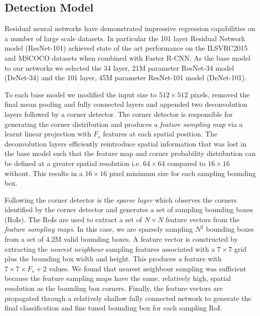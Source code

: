 \documentclass[10pt,twocolumn]{article}
\begin{document}
\newpage


\subsection{Detection Model} \label{sec:model}

Residual neural networks \cite{resnet} have demonstrated impressive regression capabilities on a number of large scale datasets. In particular the 101 layer Residual Network model (ResNet-101) achieved state of the art performance on the ILSVRC2015\cite{imagenet} and MSCOCO\cite{mscoco} datasets when combined with Faster R-CNN. As the base model to our networks we selected the 34 layer, 21M parameter ResNet-34 model (DeNet-34) and the 101 layer, 45M parameter ResNet-101 model (DeNet-101).



To each base model we modified the input size to $512\times 512$ pixels, removed the final mean pooling and fully connected layers and appended two deconvolution\cite{deconv} layers followed by a corner detector. The corner detector is responsible for generating the corner distribution and produces a \textit{feature sampling map} via a learnt linear projection with $F_s$ features at each spatial position. The deconvolution\cite{deconv} layers efficiently reintroduce spatial information that was lost in the base model such that the feature map and corner probability distribution can be defined at a greater spatial resolution i.e. $64\times 64$ compared to $16\times 16$ without. This results in a $16\times 16$ pixel minimum size for each sampling bounding box.

Following the corner detector is the \textit{sparse layer} which observes the corners identified by the corner detector and generates a set of sampling bounding boxes (RoIs). The RoIs are used to extract a set of $N \times N$ feature vectors from the \textit{feature sampling maps}. In this case, we are sparsely sampling $N^2$ bounding boxes from a set of 4.2M valid bounding boxes. A feature vector is constructed by extracting the \textit{nearest neighbour} sampling features associated with a $7\times 7$ grid plus the bounding box width and height. This produces a feature with $7 \times 7 \times F_s + 2$ values. We found that nearest neighbour sampling was sufficient because the feature sampling maps have the same, relatively high, spatial resolution as the bounding box corners. Finally, the feature vectors are propagated through a relatively shallow fully connected network to generate the final classification and fine tuned bounding box for each sampling RoI. 
\end{document}
